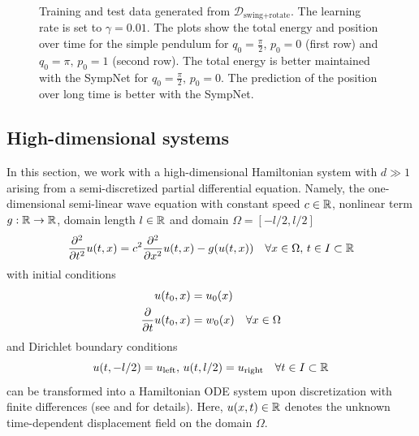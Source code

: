 \documentclass[twoside,a4paper]{article}
\begin{document}
\begin{figure}
	\caption{
	Training and test data generated from $\mathcal{D}_{\text{swing+rotate}}$.
	The learning rate is set to $\gamma = 0.01$.
	The plots show the total energy and position over time for the simple pendulum for 
	$q_0 = \frac{\pi}{2},\, p_0 = 0$
	(first row) and $q_0 = \pi,\, p_0=1$ (second row).
	The total energy is better maintained with the SympNet for $q_0 = \frac{\pi}{2},\, p_0 = 0$.
	The prediction of the position over long time is better with the SympNet.}
\end{figure}

\FloatBarrier
\subsection{High-dimensional systems}

In this section, we work with a high-dimensional Hamiltonian system with $d \gg 1$
arising from a semi-discretized partial differential equation.
Namely,
the one-dimensional semi-linear wave equation with constant speed $c \in \mathbb{R}$, nonlinear term 
$g : \mathbb{R} \to \mathbb{R}$, domain length $l \in \mathbb{R}$ and domain $\Omega = [-l/2, l/2]$
\begin{equation*}
	\frac{\partial^2}{\partial t^2} u(t,x) = 
	c^2 \frac{\partial^2}{\partial x^2} u(t,x) - g(u(t,x)) 
	\quad \forall x \in \Omega, 
	\, t \in I \subset \mathbb{R}
\end{equation*}
with initial conditions
\begin{align*}
	u(t_0,x) &= u_0(x) \\
	\frac{\partial }{\partial t} u(t_0,x) &= w_0(x) \quad \forall x \in \Omega
\end{align*}
and Dirichlet boundary conditions
\begin{equation*}
	u(t,-l/2) = u_{\text{left}}, \, u(t,l/2) = u_{\text{right}} \quad \forall t \in I \subset \mathbb{R}
\end{equation*}
can be transformed into a Hamiltonian ODE system upon discretization with finite differences
(see \cite{2006ham_pde} and \cite{peng2016} for details). 
Here, $u(x,t) \in \mathbb{R}$ denotes the unknown time-dependent displacement field on the domain $\Omega$.
\end{document}
